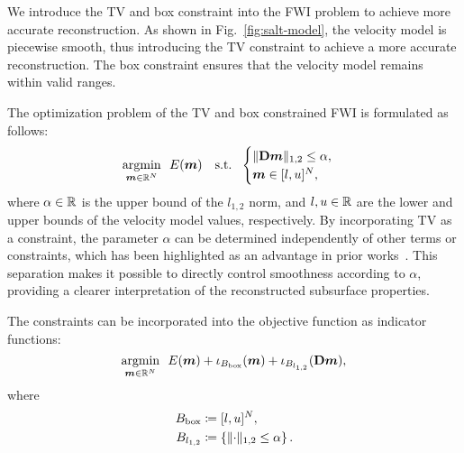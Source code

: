 

We introduce the TV and box constraint into the FWI problem to achieve more accurate reconstruction.
As shown in Fig.~\ref{fig:salt-model}, the velocity model is piecewise smooth, thus introducing the TV constraint to achieve a more accurate reconstruction.
The box constraint ensures that the velocity model remains within valid ranges.

The optimization problem of the TV and box constrained FWI is formulated as follows:
\begin{equation} \label{eq:FWIObjectiveWithTVConstraint} \argmin{\velModel \in \realNumber^N} \ \ \FWIObjectiveWithTVConstraint \end{equation}
where $\alpha \in \mathbb{R}$ is the upper bound of the $l_{1,2}$ norm, and $l, u \in \mathbb{R}$ are the lower and upper bounds of the velocity model values, respectively.
By incorporating TV as a constraint, the parameter $\alpha$ can be determined independently of other terms or constraints, which has been highlighted as an advantage in prior works~\cite{constraint0,constraint1,constraint2,constraint3,constraint4,constraints-vs-penalties-in-FWI}.
This separation makes it possible to directly control smoothness according to $\alpha$, providing a clearer interpretation of the reconstructed subsurface properties.

The constraints can be incorporated into the objective function as indicator functions:
\begin{equation} \label{eq:FWIObjectiveWithTVConstraintWithIndicatorFunction} \argmin{\velModel \in \realNumber^N} \ \ \FWIObjectiveWithTVConstraintWithIndicatorFunction, \end{equation}
where
\begin{equation} \label{eq:LOneTwoBallDefinition} \begin{aligned} \BoxBall & \coloneqq [l,u]^N, \\ \LOneTwoBall & \coloneqq \LOneTwoBallSetDefinition. \end{aligned} \end{equation}


